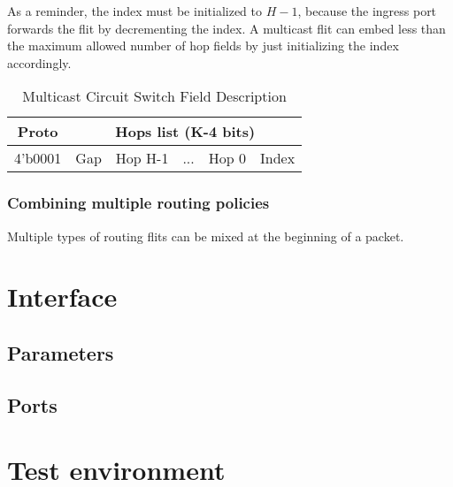 As a reminder, the index must be initialized to $H-1$, because the ingress port forwards the flit by decrementing the
index. A multicast flit can embed less than the maximum allowed number of hop fields by just initializing the index
accordingly.

\begin{table}[h]
  \centering
  \begin{tabular}{c | c | c | c | c | c}
    \toprule
    \hline
    \textbf{Proto} & \multicolumn{5}{c}{\textbf{Hops list (K-4 bits)}} \\
    \hline\hline
    4'b0001 & Gap & Hop H-1 & ... & Hop 0 & Index \\
    \hline
    \bottomrule
  \end{tabular}
  \caption{\label{multicast_circuit_switch_field} Multicast Circuit Switch Field Description}
\end{table}

\subsubsection{Combining multiple routing policies}

Multiple types of routing flits can be mixed at the beginning of a packet.

\section{Interface}

\subsection{Parameters}

\subsection{Ports}

\section{Test environment}
